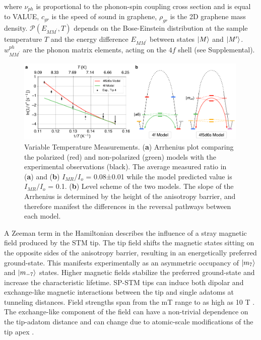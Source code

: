 \documentclass[
reprint,amsmath,amssymb,aps]{revtex4-2}
\begin{document}
where $\nu_{ph}$ is proportional to the phonon-spin coupling cross section and is equal to VALUE, $c_{gr}$ is the speed of sound in graphene, $\rho_{gr}$ is the 2D graphene mass density. $\mathcal{P}\left( E_{MM^{\prime}}, T \right)$ depends on the Bose-Einstein distribution at the sample temperature $T$ and the energy difference $E_{MM^{\prime}}$ between states $\ket{M}$ and $\ket{M^{\prime}}$. $w^{ph}_{MM^{\prime}}$ are the phonon matrix elements, acting on the $4f$ shell (see Supplemental).

\begin{figure}[t!]
\includegraphics[width=0.99\textwidth]{Fig3_new.pdf}
\caption{Variable Temperature Measurements. (\textbf{a}) Arrhenius plot comparing the polarized (red) and non-polarized (green) models with the experimental observations (black). The average measured ratio in (\textbf{a}) and (\textbf{b}) $I_{MR}/I_{o}$ = 0.08±0.01 while the model predicted value is $I_{MR}/I_{o}$ = 0.1. (\textbf{b}) Level scheme of the two models. The slope of the Arrhenius is determined by the height of the anisotropy barrier, and therefore manifest the differences in the reversal pathways between each model. 
\label{fig:temp} }
\end{figure}

A Zeeman term in the Hamiltonian describes the influence of a stray magnetic field produced by the STM tip. The tip field shifts the magnetic states sitting on the opposite sides of the anisotropy barrier, resulting in an energetically preferred ground-state. This manifests experimentally as an asymmetric occupancy of $\ket{m_7}$ and $\ket{m_{-7}}$ states. Higher magnetic fields stabilize the preferred ground-state and increase the characteristic lifetime. SP-STM tips can induce both dipolar and exchange-like magnetic interactions between the tip and single adatoms at tunneling distances. Field strengths span from the mT range to as high as 10 T \cite{yang2019}. The exchange-like component of the field can have a non-trivial dependence on the tip-adatom distance and can change due to atomic-scale modifications of the tip apex \cite{hauptmannQuantifyingExchangeForces2020,tao_SwitchingSingleSpin_2009,lazoFirstprinciplesStudyMagnetic2011,lazoRoleTipSize2008}.  
\end{document}
